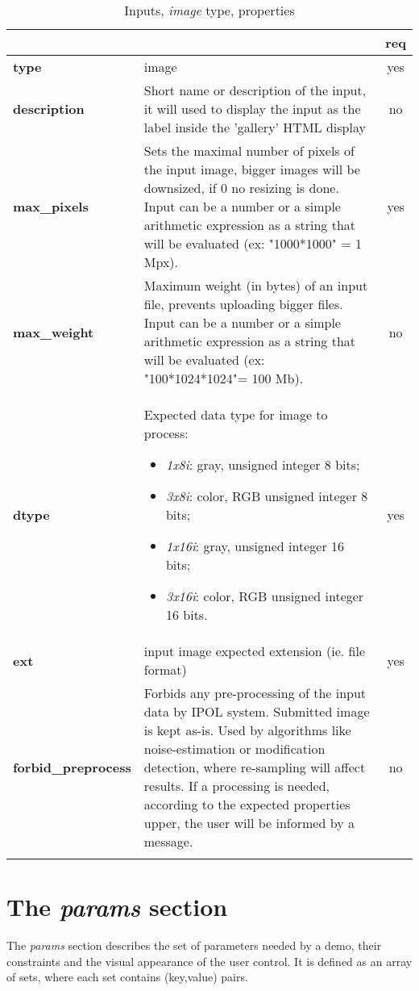 \begin{longtable}{|>{\bf}L{\linewidth}|L{\linewidth}|c|}
\hline
{}     &  & {\bf req} \tabularnewline 
\hline \hline
 type         & image & yes \\ \hline
 description  & Short name or description of the input, it will used to display 
the input as the label inside the 'gallery' HTML display & no \\ \hline
 max\_pixels   &  Sets the maximal number of pixels of the input image, 
bigger images will be downsized, if 0 no resizing is done. 
Input can be a number or a simple arithmetic expression as a string that will be evaluated (ex: "1000*1000" = 1 Mpx).  & yes \\ \hline
 max\_weight   & Maximum weight (in bytes) of an input file, prevents uploading 
bigger files.
Input can be a number or a simple arithmetic expression as a string that will be evaluated (ex: "100*1024*1024"= 100 Mb). & no \\ \hline
 dtype        & Expected data type for image to process:
\vspace{-1em}
\begin{itemize}
  \setlength\itemsep{-0.5em}
  \item \textit{1x8i}: gray, unsigned integer 8 bits;
  \item \textit{3x8i}: color, RGB unsigned integer 8 bits;
  \item \textit{1x16i}: gray, unsigned integer 16 bits;
  \item \textit{3x16i}: color, RGB unsigned integer 16 bits.
\end{itemize} 
\vspace{-1em} & yes \\ \hline
 ext          & input image expected extension (ie. file format) & yes \\ \hline
forbid\_preprocess         & Forbids any pre-processing of the input data by IPOL system. 
Submitted image is kept as-is.
Used by algorithms like noise-estimation or modification detection, where re-sampling will affect results. 
If a processing is needed, according to the expected properties upper, the user will be informed by a message.
& no \\ \hline
\caption{Inputs, \emph{image} type, properties}
\end{longtable}

\section{The \emph{params} section}
The \emph{params} section describes the set of parameters needed by a demo, their 
constraints and the visual appearance of the user control. It is defined as an array of sets, 
where each set contains (key,value) pairs.


